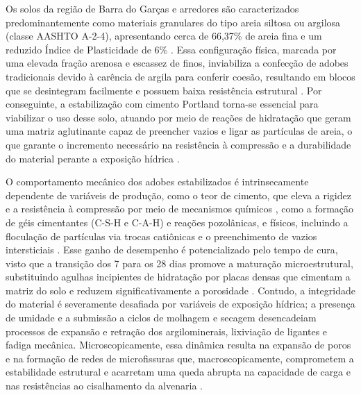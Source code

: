 
Os solos da região de Barra do Garças e arredores são caracterizados predominantemente como materiais granulares do tipo areia siltosa ou argilosa (classe AASHTO A-2-4), apresentando cerca de 66,37\% de areia fina e um reduzido Índice de Plasticidade de 6\%  \cite{Barroso2019, Barroso2023, Santos2018, Silva2019}. Essa configuração física, marcada por uma elevada fração arenosa e escassez de finos, inviabiliza a confecção de adobes tradicionais devido à carência de argila para conferir coesão, resultando em blocos que se desintegram facilmente e possuem baixa resistência estrutural \cite{Junior2021, Silva2019}. Por conseguinte, a estabilização com cimento Portland torna-se essencial para viabilizar o uso desse solo, atuando por meio de reações de hidratação que geram uma matriz aglutinante capaz de preencher vazios e ligar as partículas de areia, o que garante o incremento necessário na resistência à compressão e a durabilidade do material perante a exposição hídrica \cite{Novato2019, Silva2019}.


O comportamento mecânico dos adobes estabilizados é intrinsecamente dependente de variáveis de produção, como o teor de cimento, que eleva a rigidez e a resistência à compressão por meio de mecanismos químicos \cite{Roshan2022, Zhang2025, Santos2018, Aqtash2021}, como a formação de géis cimentantes (C-S-H e C-A-H) e reações pozolânicas, e físicos, incluindo a floculação de partículas via trocas catiônicas e o preenchimento de vazios intersticiais \cite{Zhang2025, Ding2021, Messis2022}. Esse ganho de desempenho é potencializado pelo tempo de cura, visto que a transição dos 7 para os 28 dias promove a maturação microestrutural, substituindo agulhas incipientes de hidratação por placas densas que cimentam a matriz do solo e reduzem significativamente a porosidade \cite{Yang2024, Hwang2022}. Contudo, a integridade do material é severamente desafiada por variáveis de exposição hídrica; a presença de umidade e a submissão a ciclos de molhagem e secagem desencadeiam processos de expansão e retração dos argilominerais, lixiviação de ligantes e fadiga mecânica. Microscopicamente, essa dinâmica resulta na expansão de poros e na formação de redes de microfissuras que, macroscopicamente, comprometem a estabilidade estrutural e acarretam uma queda abrupta na capacidade de carga e nas resistências ao cisalhamento da alvenaria \cite{Liu2023, Chen2024}.

